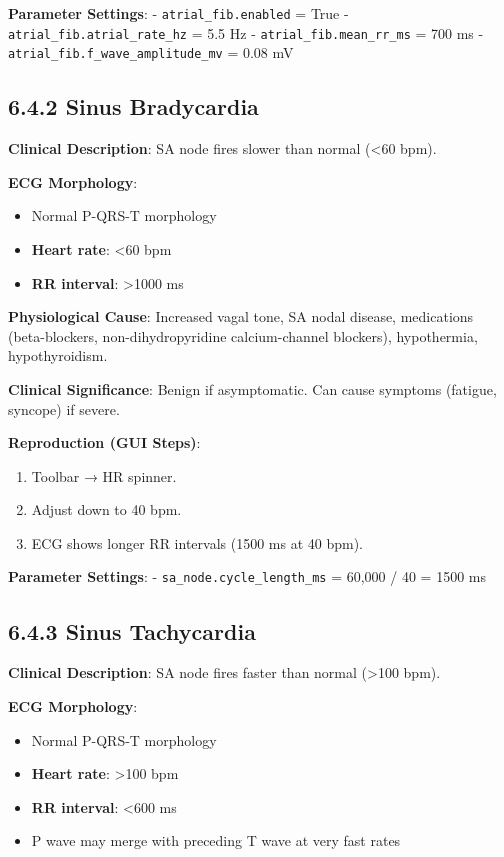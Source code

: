 \documentclass[12pt,oneside,a4paper]{book}
\newcommand{\code}[1]{\texttt{#1}}
\begin{document}
\textbf{Parameter Settings}:
- \code{atrial\_fib.enabled} = True
- \code{atrial\_fib.atrial\_rate\_hz} = 5.5 Hz
- \code{atrial\_fib.mean\_rr\_ms} = 700 ms
- \code{atrial\_fib.f\_wave\_amplitude\_mv} = 0.08 mV

\subsection{6.4.2 Sinus Bradycardia}

\textbf{Clinical Description}:
SA node fires slower than normal (\textless 60 bpm).

\textbf{ECG Morphology}:
\begin{itemize}
  \item Normal P-QRS-T morphology
  \item \textbf{Heart rate}: \textless 60 bpm
  \item \textbf{RR interval}: \textgreater 1000 ms
\end{itemize}

\textbf{Physiological Cause}:
Increased vagal tone, SA nodal disease, medications (beta-blockers, non-dihydropyridine calcium-channel blockers), hypothermia, hypothyroidism.

\textbf{Clinical Significance}:
Benign if asymptomatic. Can cause symptoms (fatigue, syncope) if severe.

\textbf{Reproduction (GUI Steps)}:
\begin{enumerate}
  \item Toolbar → HR spinner.
  \item Adjust down to 40 bpm.
  \item ECG shows longer RR intervals (1500 ms at 40 bpm).
\end{enumerate}

\textbf{Parameter Settings}:
- \code{sa\_node.cycle\_length\_ms} = 60,000 / 40 = 1500 ms

\subsection{6.4.3 Sinus Tachycardia}

\textbf{Clinical Description}:
SA node fires faster than normal (\textgreater 100 bpm).

\textbf{ECG Morphology}:
\begin{itemize}
  \item Normal P-QRS-T morphology
  \item \textbf{Heart rate}: \textgreater 100 bpm
  \item \textbf{RR interval}: \textless 600 ms
  \item P wave may merge with preceding T wave at very fast rates
\end{itemize}
\end{document}
